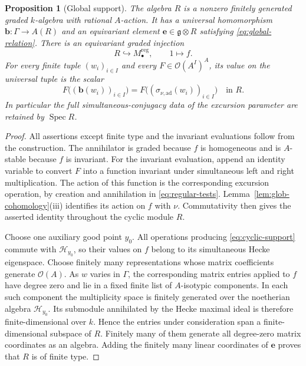 \documentclass[11pt]{article}
\numberwithin{equation}{section}
\newtheorem{proposition}[theorem]{Proposition}
\theoremstyle{definition}
\theoremstyle{remark}
\newcommand{\g}{\mathfrak g}
\newcommand{\cO}{\mathcal O}
\newcommand{\Spec}{\operatorname{Spec}}
\begin{document}
\begin{proposition}[Global support]\label{prop:global-support}
The algebra $R$ is a nonzero finitely generated graded $k$-algebra
with rational $A$-action.  It has a universal homomorphism
$\mathbf b:\Gamma\to A(R)$ and an equivariant element
$\mathbf e\in\g\otimes R$ satisfying
\eqref{eq:global-relation}.  There is an equivariant graded injection
\begin{equation}\label{eq:cyclic-support}
                   R\hookrightarrow M_\bullet^{\mathrm{reg}},
                          \qquad 1\longmapsto f.
\end{equation}
For every finite tuple $(w_i)_{i\in I}$ and every
$F\in\cO(A^I)^A$, its value on the universal tuple is the scalar
\[
 F\bigl((\mathbf b(w_i))_{i\in I}\bigr)
       =F\bigl((\sigma_{\nu,\mathrm{ad}}(w_i))_{i\in I}\bigr)
                                                   \quad\text{in }R.
\]
In particular the full simultaneous-conjugacy data of the excursion
parameter are retained by $\Spec R$.
\end{proposition}

\begin{proof}
All assertions except finite type and the invariant evaluations
follow from the construction.  The annihilator is graded because
$f$ is homogeneous and is $A$-stable because $f$ is invariant.
For the invariant evaluation, append an identity variable to convert
$F$ into a function invariant under simultaneous left and right
multiplication.  The action of this function is the corresponding
excursion operation, by creation and annihilation in
\eqref{eq:regular-tests}.  Lemma~\ref{lem:glob-cohomology}(iii)
identifies its action on $f$ with $\nu$.  Commutativity then gives
the asserted identity throughout the cyclic module $R$.

Choose one auxiliary good point $y_0$.  All operations producing
\eqref{eq:cyclic-support} commute with $\mathcal H_{y_0}$, so their
values on $f$ belong to its simultaneous Hecke eigenspace.  Choose
finitely many representations whose matrix coefficients generate
$\cO(A)$.  As $w$ varies in $\Gamma$, the corresponding matrix
entries applied to $f$ have degree zero and lie in a fixed finite
list of $A$-isotypic components.  In each such component the
multiplicity space is finitely generated over the noetherian algebra
$\mathcal H_{y_0}$.  Its submodule annihilated by the Hecke maximal
ideal is therefore finite-dimensional over $k$.  Hence the entries
under consideration span a finite-dimensional subspace of $R$.
Finitely many of them generate all degree-zero matrix coordinates
as an algebra.  Adding the finitely many linear coordinates of
$\mathbf e$ proves that $R$ is of finite type.
\end{proof}
\end{document}
